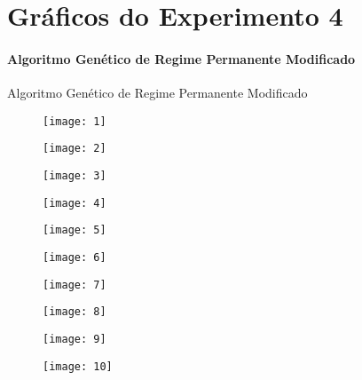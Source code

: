 
\chapter{Gráficos do Experimento 4}
\subsubsection{Algoritmo Genético de Regime Permanente Modificado}


Algoritmo Genético de Regime Permanente Modificado

\begin{figure}[H]
\centering

\texttt{[image: 1]}

\end{figure}

\begin{figure}[H]
\centering

\texttt{[image: 2]}

\end{figure}


\begin{figure}[H]
\centering

\texttt{[image: 3]}

\end{figure}

\begin{figure}[H]
\centering

\texttt{[image: 4]}

\end{figure}


\begin{figure}[H]
\centering

\texttt{[image: 5]}

\end{figure}

\begin{figure}[H]
\centering

\texttt{[image: 6]}

\end{figure}

\begin{figure}[H]
\centering

\texttt{[image: 7]}

\end{figure}

\begin{figure}[H]
\centering

\texttt{[image: 8]}

\end{figure}

\begin{figure}[H]
\centering

\texttt{[image: 9]}

\end{figure}

\begin{figure}[H]
\centering

\texttt{[image: 10]}

\end{figure}